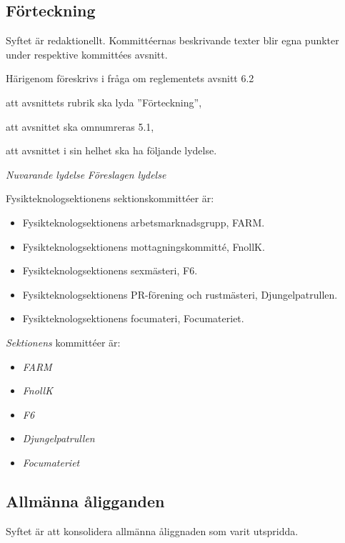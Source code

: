 \documentclass{article}
\newenvironment{lydelse}
    {\begin{paracol}{2}%
        \emph{Nuvarande lydelse}%
        \switchcolumn%
        \emph{Föreslagen lydelse}%
    \end{paracol}%
    \begin{enumerate}[label=\thesubsection.\arabic*]%
    \begin{paracol}{2}%
    }{\end{paracol}\end{enumerate}}
\begin{document}
\subsection{Förteckning}
Syftet är redaktionellt.
Kommittéernas beskrivande texter blir egna punkter under respektive kommittées avsnitt.

Härigenom föreskrivs i fråga om reglementets avsnitt 6.2

\begin{dels}
    \item att avsnittets rubrik ska lyda ''Förteckning'',
    \item att avsnittet ska omnumreras 5.1,
    \item att avsnittet i sin helhet ska ha följande lydelse.
\end{dels}

\begin{lydelse}
    \setcounter{section}{6}
    \setcounter{subsection}{2}
    \item Fysikteknologsektionens sektionskommittéer är:
	\begin{itemize}
		\item Fysikteknologsektionens arbetsmarknadsgrupp, FARM.
		\item Fysikteknologsektionens mottagningskommitté, FnollK.
		\item Fysikteknologsektionens sexmästeri, F6.
		\item Fysikteknologsektionens PR-förening och rustmästeri, Djungelpatrullen.
		\item Fysikteknologsektionens focumateri, Focumateriet. 
	\end{itemize}
	\setcounter{section}{5}
	\setcounter{subsection}{1}
    \switchcolumn
    
    \item \emph{Sektionens} kommittéer är:
    \begin{itemize}
        \item \emph{FARM}
    	\item \emph{FnollK}
    	\item \emph{F6}
    	\item \emph{Djungelpatrullen}
    	\item \emph{Focumateriet}
    \end{itemize}
\end{lydelse}

\subsection{Allmänna åligganden}
Syftet är att konsolidera allmänna åliggnaden som varit utspridda.
\end{document}
